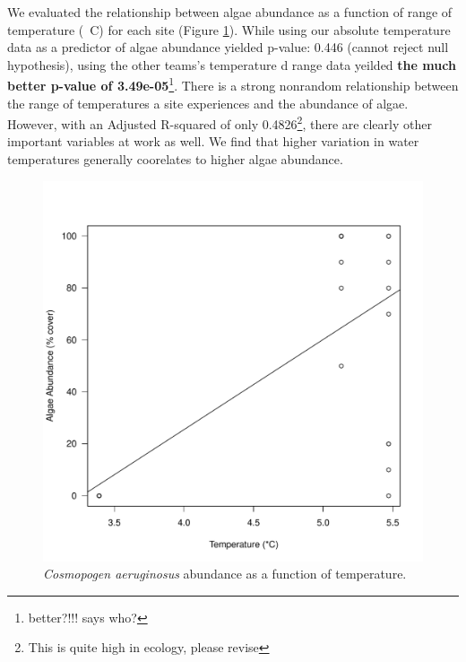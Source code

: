 \documentclass{article}\usepackage[]{graphicx}\usepackage[]{color}
\makeatletter
\def\maxwidth{ %
  \ifdim\Gin@nat@width>\linewidth
    \linewidth
  \else
    \Gin@nat@width
  \fi
}
\newenvironment{knitrout}{}{} %
\makeatother
\begin{document}
We evaluated the relationship between algae abundance as a function of range of temperature (\textdegree~C) for each site (Figure \ref{fig:tempalgae}). While using our absolute temperature data as a predictor of algae abundance yielded p-value: 0.446 (cannot reject null hypothesis), using the other teams's temperature d range data yeilded \textbf{the much better p-value of 3.49e-05}\footnote{better?!!! says who?}. There is a strong nonrandom relationship between the range of temperatures a site experiences and the abundance of algae. However, with an Adjusted R-squared of only 0.4826\footnote{This is quite high in ecology, please revise}, there are clearly other important variables at work as well. We find that higher variation in water temperatures generally coorelates to higher algae abundance.

\begin{figure}[!ht]
\begin{knitrout}
\color{fgcolor}
\includegraphics[width=\maxwidth]{figure/unnamed-chunk-5-1} 

\end{knitrout}
\caption{\emph{Cosmopogen aeruginosus} abundance as a function of temperature.}
\label{fig:tempalgae}
\end{figure}
\end{document}
